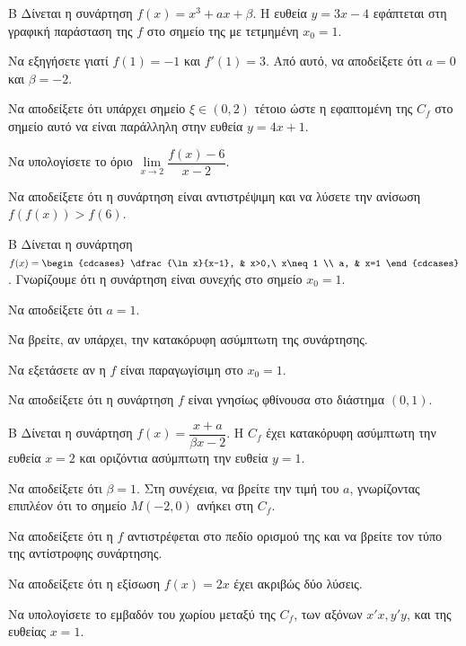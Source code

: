 \begin{thema}{Β}
Δίνεται η συνάρτηση $f(x) = x^3 + a x + \beta$. Η ευθεία $y = 3x - 4$ εφάπτεται στη γραφική παράσταση της $f$ στο σημείο της με τετμημένη $x_0=1$.
\begin{erwthma}
  \item Να εξηγήσετε γιατί $f(1) = -1$ και $f'(1) = 3$. Από αυτό, να αποδείξετε ότι $a=0$ και $\beta=-2$.
  \item Να αποδείξετε ότι υπάρχει σημείο $\xi \in (0, 2)$ τέτοιο ώστε η εφαπτομένη της $C_f$ στο σημείο αυτό να είναι παράλληλη στην ευθεία $y = 4x+1$.
  \item Να υπολογίσετε το όριο $\lim\limits_{x \to 2} \dfrac{f(x)-6}{x-2}$.
  \item Να αποδείξετε ότι η συνάρτηση είναι αντιστρέψιμη και να λύσετε την ανίσωση $f(f(x)) > f(6)$.
\end{erwthma}
\end{thema}

\begin{thema}{Β}
Δίνεται η συνάρτηση $f(x) = \begin{cdcases} \dfrac{\ln x}{x-1}, & x>0,\ x\neq1 \\ a, & x=1 \end{cdcases}$. Γνωρίζουμε ότι η συνάρτηση είναι συνεχής στο σημείο $x_0=1$.
\begin{erwthma}
  \item Να αποδείξετε ότι $a=1$.
  \item Να βρείτε, αν υπάρχει, την κατακόρυφη ασύμπτωτη της συνάρτησης.
  \item Να εξετάσετε αν η $f$ είναι παραγωγίσιμη στο $x_0=1$.
  \item Να αποδείξετε ότι η συνάρτηση $f$ είναι γνησίως φθίνουσα στο διάστημα $(0, 1)$.
\end{erwthma}
\end{thema}

\begin{thema}{Β}
Δίνεται η συνάρτηση $f(x) = \dfrac{x+a}{\beta x-2}$. Η $C_f$ έχει κατακόρυφη ασύμπτωτη την ευθεία $x=2$ και οριζόντια ασύμπτωτη την ευθεία $y=1$.
\begin{erwthma}
  \item Να αποδείξετε ότι $\beta=1$. Στη συνέχεια, να βρείτε την τιμή του $a$, γνωρίζοντας επιπλέον ότι το σημείο $M(-2, 0)$ ανήκει στη $C_f$.
  \item Να αποδείξετε ότι η $f$ αντιστρέφεται στο πεδίο ορισμού της και να βρείτε τον τύπο της αντίστροφης συνάρτησης.
  \item Να αποδείξετε ότι η εξίσωση $f(x) = 2x$ έχει ακριβώς δύο λύσεις.
  \item Να υπολογίσετε το εμβαδόν του χωρίου μεταξύ της $C_f$, των αξόνων $x'x, y'y$, και της ευθείας $x=1$.
\end{erwthma}
\end{thema}

